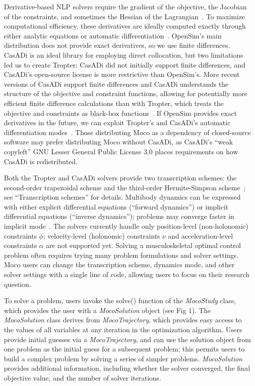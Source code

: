 \documentclass[10pt,letterpaper]{article}
\begin{document}
Derivative-based NLP solvers require the gradient of the objective, the Jacobian of the constraints, and sometimes the Hessian of the Lagrangian~\cite{Betts:2010}. To maximize computational efficiency, these derivatives are ideally computed exactly through either analytic equations or automatic differentiation~\cite{Andersson:2019,Walther:2003}. OpenSim’s main distribution does not provide exact derivatives, so we use finite differences. CasADi is an ideal library for employing direct collocation, but two limitations led us to create Tropter: CasADi did not initially support finite differences, and CasADi’s open-source license is more restrictive than OpenSim’s. More recent versions of CasADi support finite differences and CasADi understands the structure of the objective and constraint functions, allowing for potentially more efficient finite difference calculations than with Tropter, which treats the objective and constraints as black-box functions~\cite{Patterson:2012}. If OpenSim provides exact derivatives in the future, we can exploit Tropter’s and CasADi’s automatic differentiation modes~\cite{Falisse:2019a}. Those distributing Moco as a dependency of closed-source software may prefer distributing Moco without CasADi, as CasADi’s “weak copyleft” GNU Lesser General Public License 3.0 places requirements on how CasADi is redistributed.

Both the Tropter and CasADi solvers provide two transcription schemes: the second-order trapezoidal scheme and the third-order Hermite-Simpson scheme~\cite{Betts:2010}; see “Transcription schemes” for details. Multibody dynamics can be expressed with either explicit differential equations (“forward dynamics”) or implicit differential equations (“inverse dynamics”); problems may converge faster in implicit mode~\cite{vandenBogert:2011fv}.
The solvers currently handle only position-level (non-holonomic) constraints $\phi$; velocity-level (holonomic) constraints $\nu$ and acceleration-level constraints $\alpha$ are not supported yet.
Solving a musculoskeletal optimal control problem often requires trying many problem formulations and solver settings.
Moco users can change the transcription scheme, dynamics mode, and other solver settings with a single line of code, allowing users to focus on their research question.

To solve a problem, users invoke the solve() function of the \textit{MocoStudy} class, which provides the user with a \textit{MocoSolution} object (see Fig 1). The \textit{MocoSolution} class derives from \textit{MocoTrajectory}, which provides easy access to the values of all variables at any iteration in the optimization algorithm. Users provide initial guesses via a \textit{MocoTrajectory}, and can use the solution object from one problem as the initial guess for a subsequent problem; this permits users to build a complex problem by solving a series of simpler problems. \textit{MocoSolution} provides additional information, including whether the solver converged, the final objective value, and the number of solver iterations.
\end{document}
